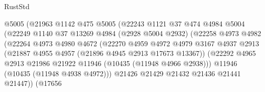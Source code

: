 \begin{lexlean}{RustStd}
\begin{coremodule}
                                  @5005
                                  (@21963
                                    @1142
                                    @475
                                    @5005
                                    (@22243
                                      @1121
                                      @37
                                      @474
                                      @4984
                                      @5004
                                      (@22249
                                        @1140
                                        @37
                                        @13269
                                        @4984
                                        (@2928 @5004 @2932)
                                        (@22258
                                          @4973
                                          @4982
                                          (@22264
                                            @4973
                                            @4980
                                            @4672
                                            (@22270
                                              @4959
                                              @4972
                                              @4979
                                              @3167
                                              @4937
                                              @2913
                                              (@21887
                                                @4955
                                                @4957
                                                (@21896 @4945 @2913 @17673 @13367))
                                              (@22292
                                                @4965
                                                @2913
                                                @21986
                                                @21922
                                                @11946
                                                (@10435 (@11948 @4966 @2938)))
                                              @11946
                                              (@10435 (@11948 @4938 @4972)))
                                            @21426
                                            @21429
                                            @21432
                                            @21436
                                            @21441
                                            @21447))
                                        (@17656

\end{coremodule}
\end{lexlean}
